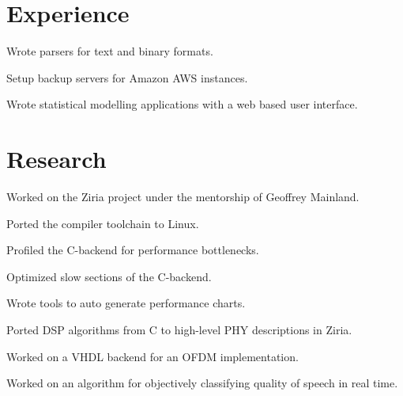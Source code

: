 \documentclass[]{deedy}
\begin{document}
\hfill
\begin{minipage}[t]{0.66\textwidth} 


\section{Experience}
\sectionsep

\vspace{\topsep} %
\begin{tightemize}
\item Wrote parsers for text and binary formats.
\item Setup backup servers for Amazon AWS instances.
\item Wrote statistical modelling applications with a web based user interface.
\end{tightemize}
\sectionsep


\section{Research}
\begin{tightemize}
\item Worked on the Ziria project under the mentorship of Geoffrey Mainland.
\item Ported the compiler toolchain to Linux.
\item Profiled the C-backend for performance bottlenecks.
\item Optimized slow sections of the C-backend.
\item Wrote tools to auto generate performance charts.
\item Ported DSP algorithms from C to high-level PHY descriptions in Ziria.
\item Worked on a VHDL backend for an OFDM implementation.
\end{tightemize}
\sectionsep

Worked on an algorithm for objectively classifying quality of speech in real time.
\sectionsep


\end{minipage}
\end{document}
